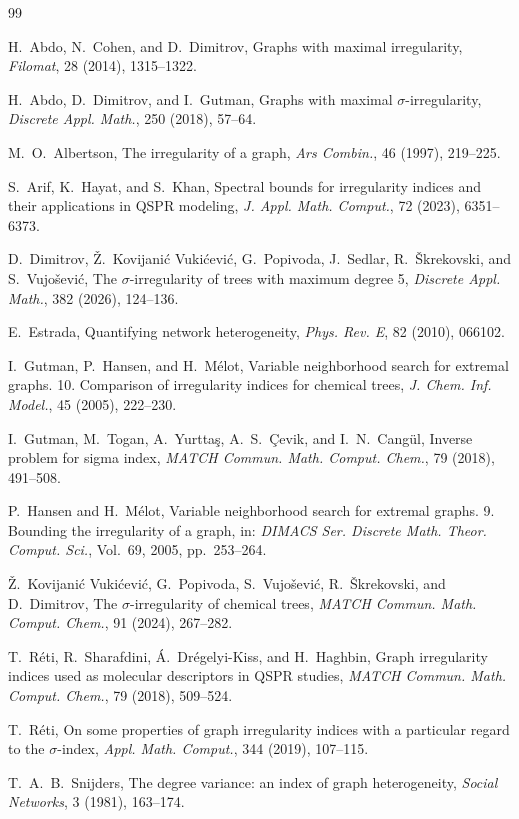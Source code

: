 \documentclass[preprint,12pt]{elsarticle}
\begin{document}
\begin{thebibliography}{99}







H.~Abdo, N.~Cohen, and D.~Dimitrov,  
Graphs with maximal irregularity,  
\emph{Filomat}, 28 (2014), 1315--1322.

H.~Abdo, D.~Dimitrov, and I.~Gutman,  
Graphs with maximal $\sigma$-irregularity,  
\emph{Discrete Appl. Math.}, 250 (2018), 57--64.

M.~O.~Albertson,  
The irregularity of a graph,  
\emph{Ars Combin.}, 46 (1997), 219--225.

S.~Arif, K.~Hayat, and S.~Khan,  
Spectral bounds for irregularity indices and their applications in QSPR modeling,  
\emph{J. Appl. Math. Comput.}, 72 (2023), 6351--6373.

D.~Dimitrov, Ž.~Kovijanić Vukićević, G.~Popivoda, J.~Sedlar, R.~Škrekovski, and S.~Vujošević,  
The $\sigma$-irregularity of trees with maximum degree 5,  
\emph{Discrete Appl. Math.}, 382 (2026), 124--136.

E.~Estrada,  
Quantifying network heterogeneity,  
\emph{Phys. Rev. E}, 82 (2010), 066102.

I.~Gutman, P.~Hansen, and H.~Mélot,  
Variable neighborhood search for extremal graphs. 10. Comparison of irregularity indices for chemical trees,  
\emph{J. Chem. Inf. Model.}, 45 (2005), 222--230.

I.~Gutman, M.~Togan, A.~Yurttaş, A.~S.~\c{C}evik, and I.~N.~Cangül,  
Inverse problem for sigma index,  
\emph{MATCH Commun. Math. Comput. Chem.}, 79 (2018), 491--508.

P.~Hansen and H.~Mélot,  
Variable neighborhood search for extremal graphs. 9. Bounding the irregularity of a graph,  
in: \emph{DIMACS Ser. Discrete Math. Theor. Comput. Sci.}, Vol.~69, 2005, pp.~253--264.

Ž.~Kovijanić Vukićević, G.~Popivoda, S.~Vujošević, R.~Škrekovski, and D.~Dimitrov,  
The $\sigma$-irregularity of chemical trees,  
\emph{MATCH Commun. Math. Comput. Chem.}, 91 (2024), 267--282.

T.~Réti, R.~Sharafdini, Á.~Drégelyi-Kiss, and H.~Haghbin,  
Graph irregularity indices used as molecular descriptors in QSPR studies,  
\emph{MATCH Commun. Math. Comput. Chem.}, 79 (2018), 509--524.

T.~Réti,  
On some properties of graph irregularity indices with a particular regard to the $\sigma$-index,  
\emph{Appl. Math. Comput.}, 344 (2019), 107--115.

T.~A.~B.~Snijders,  
The degree variance: an index of graph heterogeneity,  
\emph{Social Networks}, 3 (1981), 163--174.

\end{thebibliography}
\end{document}
